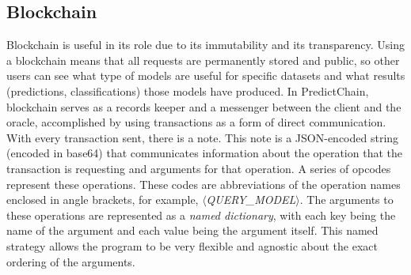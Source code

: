 \documentclass{ledger}
\begin{document}

\subsection{Blockchain}

Blockchain is useful in its role due to its immutability and its transparency. Using a blockchain means that all requests are permanently stored and public, so other users can see what type of models are useful for specific datasets and what results (predictions, classifications) those models have produced.
In PredictChain, blockchain serves as a records keeper and a messenger between the client and the oracle, accomplished by using transactions as a form of direct communication. With every transaction sent, there is a note. This note is a JSON-encoded string (encoded in base64) that communicates information about the operation that the transaction is requesting and arguments for that operation. A series of opcodes represent these operations. These codes are abbreviations of the operation names enclosed in angle brackets, for example, $\langle$\textit{QUERY\_MODEL}$\rangle$. The arguments to these operations are represented as a \emph{named dictionary}, with each key being the name of the argument and each value being the argument itself. This named strategy allows the program to be very flexible and agnostic about the exact ordering of the arguments.
\end{document}
